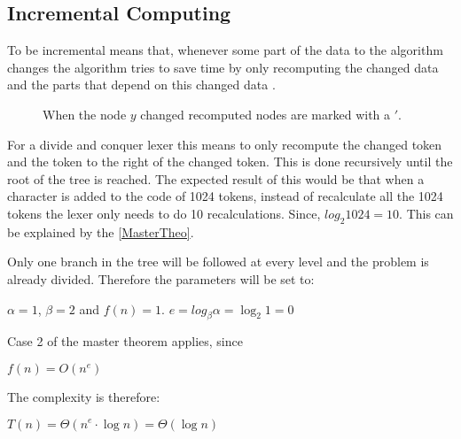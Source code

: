 \subsection{Incremental Computing}
To be incremental means that, whenever some part of the data to the algorithm
changes the algorithm tries to save time by only recomputing the changed data
and the parts that depend on this changed data \cite{incrementalDef}.

\begin{figure}[!htp]
\centering
\caption{When the node $y$ changed recomputed nodes are marked with a $'$. \label{fig:incUp}}
\end{figure}

For a divide and conquer lexer this means to only recompute the changed token
and the token to the right of the changed token. This is done recursively until
the root of the tree is reached. The expected result of this would be that when
a character is added to the code of 1024 tokens, instead of recalculate all the 
1024 tokens the lexer only needs to do 10 recalculations. Since,
$log_2 1024 = 10$. This can be explained by the \cref{MasterTheo}.

Only one branch in the tree will be followed at every level and the problem is
already divided. Therefore the parameters will be set to:
\begin{center}
$\alpha = 1$, $\beta = 2$ and $f(n) = 1$.
$e=log_\beta\alpha=\log_2 1=0$
\end{center}
Case 2 of the master theorem applies, since
\begin{center}
$f(n) = O(n^e)$
\end{center}
The complexity is therefore:
\begin{center}
$T(n) = \Theta(n^e \cdot \log n) = \Theta(\log n)$
\end{center}

